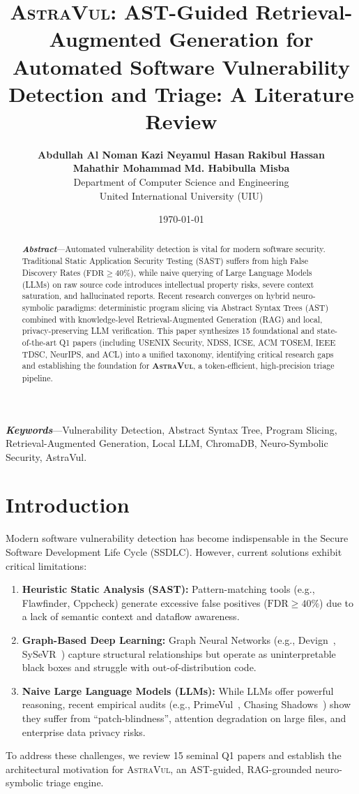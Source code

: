\documentclass[10pt,twocolumn]{article}
\title{\textbf{\Large \textsc{AstraVul}: AST-Guided Retrieval-Augmented Generation for Automated Software Vulnerability Detection and Triage: A Literature Review}}
\author{
    \textbf{Abdullah Al Noman} \quad \textbf{Kazi Neyamul Hasan} \quad \textbf{Rakibul Hassan}\\
    \textbf{Mahathir Mohammad} \quad \textbf{Md. Habibulla Misba}\\[4pt]
    Department of Computer Science and Engineering\\
    United International University (UIU)
}
\date{\today}
\begin{document}
\maketitle

\begin{abstract}
\textbf{\textit{Abstract}}---Automated vulnerability detection is vital for modern software security. Traditional Static Application Security Testing (SAST) suffers from high False Discovery Rates ($\text{FDR} \ge 40\%$), while naive querying of Large Language Models (LLMs) on raw source code introduces intellectual property risks, severe context saturation, and hallucinated reports. Recent research converges on hybrid neuro-symbolic paradigms: deterministic program slicing via Abstract Syntax Trees (AST) combined with knowledge-level Retrieval-Augmented Generation (RAG) and local, privacy-preserving LLM verification. This paper synthesizes 15 foundational and state-of-the-art Q1 papers (including USENIX Security, NDSS, ICSE, ACM TOSEM, IEEE TDSC, NeurIPS, and ACL) into a unified taxonomy, identifying critical research gaps and establishing the foundation for \textbf{\textsc{AstraVul}}, a token-efficient, high-precision triage pipeline.
\end{abstract}

\vspace{2pt}
\noindent\textbf{\textit{Keywords}}---Vulnerability Detection, Abstract Syntax Tree, Program Slicing, Retrieval-Augmented Generation, Local LLM, ChromaDB, Neuro-Symbolic Security, AstraVul.

\section{Introduction}
Modern software vulnerability detection has become indispensable in the Secure Software Development Life Cycle (SSDLC). However, current solutions exhibit critical limitations:
\begin{enumerate}[leftmargin=10pt,topsep=1pt,itemsep=0.5pt]
    \item \textbf{Heuristic Static Analysis (SAST):} Pattern-matching tools (e.g., Flawfinder, Cppcheck) generate excessive false positives ($\text{FDR} \ge 40\%$) due to a lack of semantic context and dataflow awareness.
    \item \textbf{Graph-Based Deep Learning:} Graph Neural Networks (e.g., Devign~\cite{zhou2019devign}, SySeVR~\cite{li2021sysevr}) capture structural relationships but operate as uninterpretable black boxes and struggle with out-of-distribution code.
    \item \textbf{Naive Large Language Models (LLMs):} While LLMs offer powerful reasoning, recent empirical audits (e.g., PrimeVul~\cite{zhang2025howfar}, Chasing Shadows~\cite{arp2026chasingshadows}) show they suffer from ``patch-blindness'', attention degradation on large files, and enterprise data privacy risks.
\end{enumerate}
To address these challenges, we review 15 seminal Q1 papers and establish the architectural motivation for \textsc{AstraVul}, an AST-guided, RAG-grounded neuro-symbolic triage engine.
\end{document}
